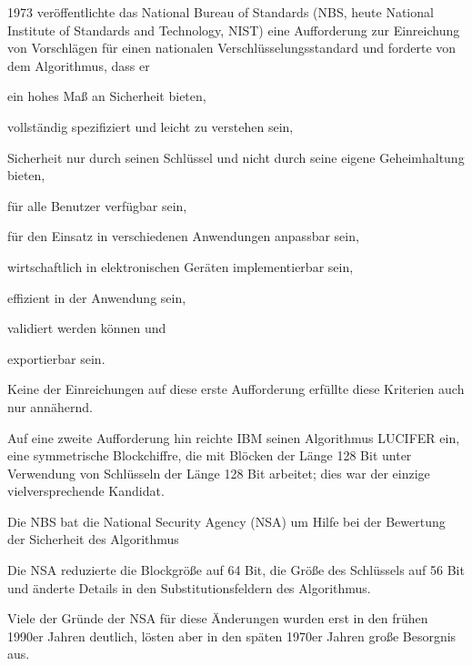 \documentclass[a4paper]{article}
\begin{document}
\begin{multicols}{3}
      \begin{itemize*}
            \item 1973 veröffentlichte das National Bureau of Standards (NBS, heute
            National Institute of Standards and Technology, NIST) eine
            Aufforderung zur Einreichung von Vorschlägen für einen nationalen
            Verschlüsselungsstandard und forderte von dem Algorithmus, dass er
            \begin{itemize*}
                  \item ein hohes Maß an Sicherheit bieten,
                  \item vollständig spezifiziert und leicht zu verstehen sein,
                  \item Sicherheit nur durch seinen Schlüssel und nicht durch seine eigene Geheimhaltung bieten,
                  \item für alle Benutzer verfügbar sein,
                  \item für den Einsatz in verschiedenen Anwendungen anpassbar sein,
                  \item wirtschaftlich in elektronischen Geräten implementierbar sein,
                  \item effizient in der Anwendung sein,
                  \item validiert werden können und
                  \item exportierbar sein.
            \end{itemize*}
            \item Keine der Einreichungen auf diese erste Aufforderung erfüllte diese
            Kriterien auch nur annähernd.
            \item Auf eine zweite Aufforderung hin reichte IBM seinen Algorithmus
            LUCIFER ein, eine symmetrische Blockchiffre, die mit Blöcken der Länge
            128 Bit unter Verwendung von Schlüsseln der Länge 128 Bit arbeitet;
            dies war der einzige vielversprechende Kandidat.
            \item Die NBS bat die National Security Agency (NSA) um Hilfe bei der
            Bewertung der Sicherheit des Algorithmus
            \begin{itemize*}
                  \item Die NSA reduzierte die Blockgröße auf 64 Bit, die Größe des Schlüssels auf 56 Bit und änderte Details in den Substitutionsfeldern des Algorithmus.
                  \item Viele der Gründe der NSA für diese Änderungen wurden erst in den frühen 1990er Jahren deutlich, lösten aber in den späten 1970er Jahren große Besorgnis aus.

\end{itemize*}
\end{itemize*}
\end{multicols}
\end{document}
